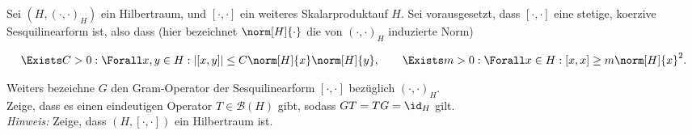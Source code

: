 \begin{exercise}

Sei $(H,(\cdot, \cdot)_H)$ ein Hilbertraum, und $[\cdot, \cdot]$ ein weiteres Skalarproduktauf $H$.
Sei vorausgesetzt, dass $[\cdot,\cdot]$ eine stetige, koerzive Sesquilinearform ist, also dass (hier bezeichnet $\norm[H]{\cdot}$ die von $(\cdot, \cdot)_H$ induzierte Norm)

\begin{align*}
  \Exists C > 0:
  \Forall x, y \in H:
  |[x, y]| \leq C\norm[H]{x} \norm[H]{y},
  \qquad
  \Exists m > 0:
  \Forall x \in H:
  [x, x] \geq m \norm[H]{x}^2.
\end{align*}

Weiters bezeichne $G$ den Gram-Operator der Sesquilinearform $[\cdot, \cdot]$ bezüglich $(\cdot, \cdot)_H$. \\
Zeige, dass es einen eindeutigen Operator $T \in \mathcal{B}(H)$ gibt, sodass $GT = TG = \id_H $ gilt. \\

\textit{Hinweis:}
Zeige, dass $(H, [\cdot, \cdot])$ ein Hilbertraum ist.

\end{exercise}


